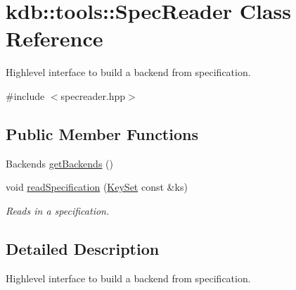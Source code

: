 \hypertarget{classkdb_1_1tools_1_1SpecReader}{\section{kdb\+:\+:tools\+:\+:Spec\+Reader Class Reference}
\label{classkdb_1_1tools_1_1SpecReader}
}


Highlevel interface to build a backend from specification.  




{\ttfamily \#include $<$specreader.\+hpp$>$}

\subsection*{Public Member Functions}
\begin{DoxyCompactItemize}
\item 
Backends \hyperlink{classkdb_1_1tools_1_1SpecReader_a0a1b4d2b7267d1dd4452f08fd898f0fd}{get\+Backends} ()
\item 
void \hyperlink{classkdb_1_1tools_1_1SpecReader_af0c638ed8094ebf3a5b4e028bbe2c38b}{read\+Specification} (\hyperlink{classkdb_1_1KeySet}{Key\+Set} const \&ks)
\begin{DoxyCompactList}\small\item\em Reads in a specification. \end{DoxyCompactList}\end{DoxyCompactItemize}


\subsection{Detailed Description}
Highlevel interface to build a backend from specification. 

